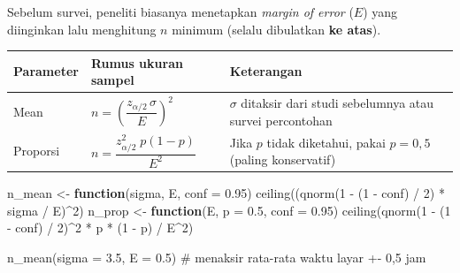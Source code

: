 \documentclass[
  indonesian,
  letterpaper,
]{book}
\newenvironment{Shaded}{\begin{snugshade}}{\end{snugshade}}
\newcommand{\AttributeTok}[1]{\textcolor[rgb]{0.40,0.45,0.13}{#1}}
\newcommand{\CommentTok}[1]{\textcolor[rgb]{0.37,0.37,0.37}{#1}}
\newcommand{\ControlFlowTok}[1]{\textcolor[rgb]{0.00,0.23,0.31}{\textbf{#1}}}
\newcommand{\DecValTok}[1]{\textcolor[rgb]{0.68,0.00,0.00}{#1}}
\newcommand{\FloatTok}[1]{\textcolor[rgb]{0.68,0.00,0.00}{#1}}
\newcommand{\FunctionTok}[1]{\textcolor[rgb]{0.28,0.35,0.67}{#1}}
\newcommand{\NormalTok}[1]{\textcolor[rgb]{0.00,0.23,0.31}{#1}}
\newcommand{\OtherTok}[1]{\textcolor[rgb]{0.00,0.23,0.31}{#1}}
\newcommand{\SpecialCharTok}[1]{\textcolor[rgb]{0.37,0.37,0.37}{#1}}
\newcounter{none} %
\begin{document}
Sebelum survei, peneliti biasanya menetapkan \emph{margin of error}
(\(E\)) yang diinginkan lalu menghitung \(n\) minimum (selalu dibulatkan
\textbf{ke atas}).

{\def\LTcaptype{none} %
\begin{longtable}[]{@{}
  >{\raggedright\arraybackslash}p{}
  >{\raggedright\arraybackslash}p{}
  >{\raggedright\arraybackslash}p{}@{}}
\toprule\noalign{}
\begin{minipage}[b]{\linewidth}\raggedright
Parameter
\end{minipage} & \begin{minipage}[b]{\linewidth}\raggedright
Rumus ukuran sampel
\end{minipage} & \begin{minipage}[b]{\linewidth}\raggedright
Keterangan
\end{minipage} \\
\midrule\noalign{}
\endhead
\bottomrule\noalign{}
\endlastfoot
Mean & \(n = \left(\dfrac{z_{\alpha/2}\,\sigma}{E}\right)^2\) &
\(\sigma\) ditaksir dari studi sebelumnya atau survei percontohan \\
Proporsi & \(n = \dfrac{z_{\alpha/2}^2\; p(1-p)}{E^2}\) & Jika \(p\)
tidak diketahui, pakai \(p = 0{,}5\) (paling konservatif) \\
\end{longtable}
}

\begin{Shaded}
\begin{Highlighting}[]
\NormalTok{n\_mean }\OtherTok{\textless{}{-}} \ControlFlowTok{function}\NormalTok{(sigma, E, }\AttributeTok{conf =} \FloatTok{0.95}\NormalTok{) }\FunctionTok{ceiling}\NormalTok{((}\FunctionTok{qnorm}\NormalTok{(}\DecValTok{1} \SpecialCharTok{{-}}\NormalTok{ (}\DecValTok{1} \SpecialCharTok{{-}}\NormalTok{ conf) }\SpecialCharTok{/} \DecValTok{2}\NormalTok{) }\SpecialCharTok{*}\NormalTok{ sigma }\SpecialCharTok{/}\NormalTok{ E)}\SpecialCharTok{\^{}}\DecValTok{2}\NormalTok{)}
\NormalTok{n\_prop }\OtherTok{\textless{}{-}} \ControlFlowTok{function}\NormalTok{(E, }\AttributeTok{p =} \FloatTok{0.5}\NormalTok{, }\AttributeTok{conf =} \FloatTok{0.95}\NormalTok{) }\FunctionTok{ceiling}\NormalTok{(}\FunctionTok{qnorm}\NormalTok{(}\DecValTok{1} \SpecialCharTok{{-}}\NormalTok{ (}\DecValTok{1} \SpecialCharTok{{-}}\NormalTok{ conf) }\SpecialCharTok{/} \DecValTok{2}\NormalTok{)}\SpecialCharTok{\^{}}\DecValTok{2} \SpecialCharTok{*}\NormalTok{ p }\SpecialCharTok{*}\NormalTok{ (}\DecValTok{1} \SpecialCharTok{{-}}\NormalTok{ p) }\SpecialCharTok{/}\NormalTok{ E}\SpecialCharTok{\^{}}\DecValTok{2}\NormalTok{)}

\FunctionTok{n\_mean}\NormalTok{(}\AttributeTok{sigma =} \FloatTok{3.5}\NormalTok{, }\AttributeTok{E =} \FloatTok{0.5}\NormalTok{)   }\CommentTok{\# menaksir rata{-}rata waktu layar +{-} 0,5 jam}
\end{Highlighting}
\end{Shaded}
\end{document}
